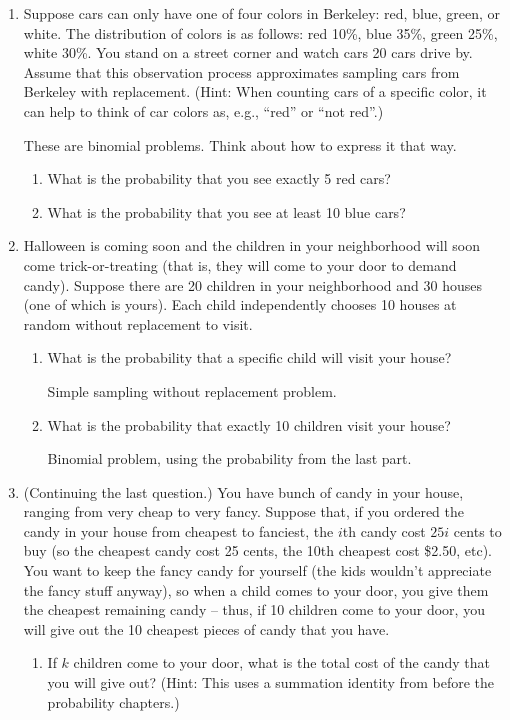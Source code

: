 \documentclass[11pt]{article}
\begin{document}
\begin{enumerate}
    \item Suppose cars can only have one of four colors in Berkeley: red, blue, green, or white. The distribution of colors is as follows: red 10\%, blue 35\%, green 25\%, white 30\%. You stand on a street corner and watch cars 20 cars drive by. Assume that this observation process approximates sampling cars from Berkeley with replacement. (Hint: When counting cars of a specific color, it can help to think of car colors as, e.g., ``red'' or ``not red''.)

        {\color{red} These are binomial problems. Think about how to express it that way.}
        \begin{enumerate}
            \item What is the probability that you see exactly 5 red cars?
            \item What is the probability that you see at least 10 blue cars?
        \end{enumerate}

    \item Halloween is coming soon and the children in your neighborhood will soon come trick-or-treating (that is, they will come to your door to demand candy). Suppose there are 20 children in your neighborhood and 30 houses (one of which is yours). Each child independently chooses 10 houses at random without replacement to visit.
        \begin{enumerate}
            \item What is the probability that a specific child will visit your house?

                {\color{red} Simple sampling without replacement problem.}
            \item What is the probability that exactly 10 children visit your house?

                {\color{red} Binomial problem, using the probability from the last part.}
        \end{enumerate}

    \item (Continuing the last question.) You have bunch of candy in your house, ranging from very cheap to very fancy. Suppose that, if you ordered the candy in your house from cheapest to fanciest, the $i$th candy cost $25i$ cents to buy (so the cheapest candy cost 25 cents, the 10th cheapest cost \$2.50, etc). You want to keep the fancy candy for yourself (the kids wouldn't appreciate the fancy stuff anyway), so when a child comes to your door, you give them the cheapest remaining candy -- thus, if 10 children come to your door, you will give out the 10 cheapest pieces of candy that you have. 
        \begin{enumerate}
            \item If $k$ children come to your door, what is the total cost of the candy that you will give out? (Hint: This uses a summation identity from before the probability chapters.)


\end{enumerate}
\end{enumerate}
\end{document}
